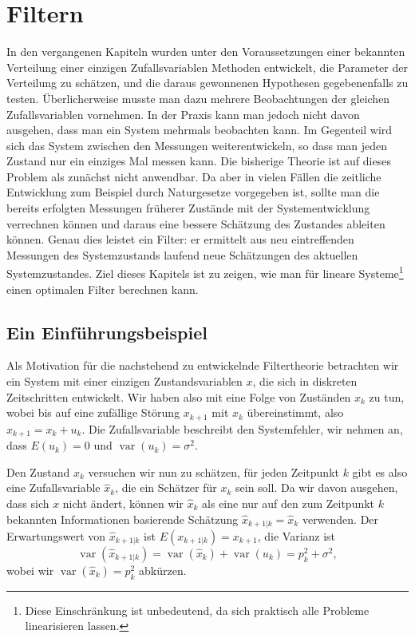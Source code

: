 %
%
%
\chapter{Filtern} \label{chapter-filtern}

In den vergangenen Kapiteln wurden unter den Voraussetzungen einer
bekannten Verteilung einer einzigen Zufallsvariablen Methoden entwickelt,
die Parameter der Verteilung zu schätzen, und die daraus gewonnenen
Hypothesen gegebenenfalls zu testen.
Überlicherweise musste man dazu
mehrere Beobachtungen der gleichen Zufallsvariablen vornehmen.
In der Praxis kann man jedoch
nicht davon ausgehen, dass man ein System mehrmals beobachten kann.
Im Gegenteil wird sich das System zwischen den Messungen weiterentwickeln,
so dass man jeden Zustand nur ein einziges Mal messen kann.
Die bisherige
Theorie ist auf dieses Problem als zunächst nicht anwendbar.
Da aber in vielen Fällen die zeitliche Entwicklung zum Beispiel durch
Naturgesetze vorgegeben ist, sollte man die bereits erfolgten Messungen
früherer Zustände mit der Systementwicklung verrechnen können und
daraus eine bessere Schätzung des Zustandes ableiten können.
Genau
dies leistet ein Filter: er ermittelt aus neu eintreffenden Messungen
des Systemzustands laufend neue Schätzungen des aktuellen Systemzustandes.
Ziel dieses Kapitels ist zu zeigen, wie man für lineare Systeme\footnote{Diese
Einschränkung ist unbedeutend, da sich praktisch alle Probleme linearisieren lassen.}
einen optimalen Filter berechnen kann.

\section{Ein Einführungsbeispiel}
Als Motivation für die nachstehend zu entwickelnde Filtertheorie betrachten
wir ein System mit einer einzigen Zustandsvariablen $x$, die sich in diskreten
Zeitschritten entwickelt.
Wir haben also mit eine Folge von Zuständen $x_k$ zu tun, wobei
bis auf eine zufällige Störung $x_{k+1}$ mit $x_k$ übereinstimmt,
also $x_{k+1}=x_k+u_k$.
Die Zufallsvariable beschreibt den Systemfehler, wir
nehmen an, dass $E(u_k)=0$ und $\operatorname{var}(u_k)=\sigma^2$.

Den Zustand $x_k$ versuchen wir nun zu schätzen, für jeden Zeitpunkt
$k$ gibt es also eine Zufallsvariable $\hat x_k$, die ein Schätzer für
$x_k$ sein soll.
Da wir davon ausgehen, dass sich $x$ nicht ändert, können wir $\hat x_k$
als eine nur auf den zum Zeitpunkt $k$ bekannten Informationen basierende
Schätzung $\hat x_{k+1|k}=\hat x_k$ verwenden.
Der Erwartungswert von $\hat x_{k+1|k}$ ist $E(x_{k+1|k})=x_{k+1}$, die Varianz
ist
\[
\operatorname{var}(\hat x_{k+1|k})
=\operatorname{var}(\hat x_k)+\operatorname{var}(u_k)=p_k^2+\sigma^2,
\]
wobei wir $\operatorname{var}(\hat x_k)=p_k^2$ abkürzen.

